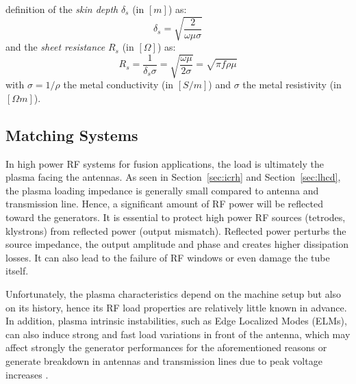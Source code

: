definition of the \textit{skin depth} $\delta_s$ (in $[\si{m}]$) as:
\begin{equation}
\delta_s 
	=
	\sqrt{\frac{2}{\omega \mu \sigma}}
	\label{eq:skin_depth}
\end{equation}
and the \textit{sheet resistance} $R_s$ (in $[\si{\Omega}]$) as:
\begin{equation}
R_s 
	= 
	\frac{1}{\delta_s \sigma}
	=
	\sqrt{\frac{\omega\mu}{2\sigma}}
	=
	\sqrt{\pi f \rho \mu }
	\label{eq:sheet_resistance}
\end{equation}
with $\sigma=1/\rho$ the metal conductivity (in $[\si{S/m}]$) and $\sigma$ the metal resistivity (in $[\si{\Omega m}]$). 

\subsection{Matching Systems}
In high power RF systems for fusion applications, the load is ultimately the plasma facing the antennas. As seen in Section~\ref{sec:icrh} and Section~\ref{sec:lhcd}, the plasma loading impedance is generally small compared to antenna and transmission line. Hence, a significant amount of RF power will be reflected toward the generators. It is essential to protect high power RF sources (tetrodes, klystrons) from reflected power (output mismatch). Reflected power perturbs the source impedance, the output amplitude and phase and creates higher dissipation losses. It can also lead to the failure of RF windows  or even damage the tube itself. 

Unfortunately, the plasma characteristics depend on the machine setup but also on its history, hence its RF load properties are relatively little known in advance. In addition, plasma intrinsic instabilities, such as Edge Localized Modes (ELMs), can also induce strong and fast load variations in front of the antenna, which may affect strongly the generator performances for the aforementioned reasons or generate breakdown in antennas and transmission lines due to peak voltage increases . 

